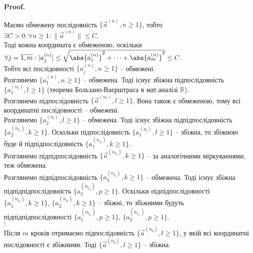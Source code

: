 \documentclass[a4paper, 10pt]{article}
\makeatletter
\def\qed{$\blacksquare$}
\theoremstyle{theoremdd}
\theoremstyle{theoremdd}
\theoremstyle{theoremdd}
\theoremstyle{theoremdd}
\theoremstyle{theoremdd}
\theoremstyle{theoremdd}
\theoremstyle{theoremdd}
\theoremstyle{theoremdd}
\theoremstyle{theoremdd}
\renewenvironment{proof}[1][Proof.\\]{\par
\pushQED{\hfill \qed}%
\normalfont \topsep6\p@\@plus6\p@\relax
\trivlist
\item\relax
{\bfseries
#1\@addpunct{.}}\hspace\labelsep\ignorespaces
}{%
\popQED\endtrivlist\@endpefalse
}
\newcommand\Norm[1]{\|#1\|}
\makeatother
\begin{document}
\begin{proof}
Маємо обмежену послідовність $\{\vec{a}^{(n)}, n \geq 1\}$, тобто $\exists C > 0: \forall n \geq 1: \Norm{\vec{a}^{(n)}} \leq C$.\\
Тоді кожна координата є обмеженою, оскільки $\forall j = \overline{1,m}: |a_j^{(n)}| \leq \sqrt{\abs{a_1^{(n)}}^2 + \dots + \abs{a_m^{(n)}}^2} \leq C$.\\
Тобто всі послідовності $\{a_j^{(n)}, n \geq 1\}$ -- обмежені.\\
Розглянемо $\{a_1^{(n)}, n \geq 1\}$ -- обмежена. Тоді існує збіжна підпослідовність $\{a_1^{(n_l)}, l \geq 1\}$ (теорема Бользано-Ваєрштраса в мат.аналізі $\mathbb{R}$).\\
Розглянемо підпослідовність $\{\vec{a}^{(n_l)}, l \geq 1\}$. Вона також є обмеженою, тому всі координатні послідовності -- обмежені.\\
Розглянемо $\{a_2^{(n_l)}, l \geq 1\}$ -- обмежена. Тоді існує збіжна підпідпослідовність $\{a_2^{(n_{l_k})}, k \geq 1 \}$. Оскільки підпослідовність $\{a_1^{(n_l)}, l \geq 1 \}$ -- збіжна, то збіжною буде й підпідпослідовність $\{a_1^{(n_{l_k})}, k \geq 1 \}$.\\
Розглянемо підпідпослідовність $\{\vec{a}^{(n_{l_k})}, k \geq 1\}$ -- за аналогічними міркуваннями, теж обмежена.\\
Розглянемо підпідпослідовність $\{a_3^{(n_{l_k})}, k \geq 1 \}$ -- обмежена. Тоді існує збіжна підпідпідпослідовність $\{a_3^{(n_{l_{k_p}})}, p \geq 1 \}$. Оскільки підпідпослідовності $\{a_1^{(n_{l_k})}, k \geq 1 \}$, $\{a_2^{(n_{l_k})}, k \geq 1 \}$ -- збіжні, то збіжними будуть підпідпідпослідовності  $\{a_1^{(n_{l_{k_p}})}, p \geq 1 \}$, $\{a_2^{(n_{l_{k_p}})}, p \geq 1 \}$.\\
$\vdots$
\\
Після $m$ кроків отримаємо підпослідовність $\{\vec{a}^{(n_q)}, l \geq 1\}$, у якій всі координатні послідовності є збіжними. Тоді $\{\vec{a}^{(n_q)}, l \geq 1\}$ -- збіжна.
\end{proof}
\end{document}
